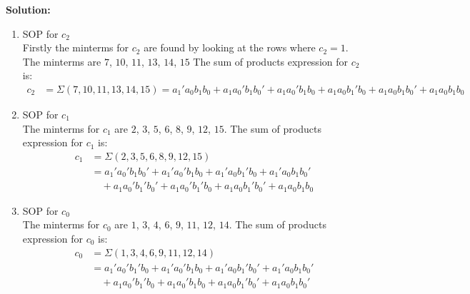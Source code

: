 \documentclass[table]{article}
\begin{document}
\begin{enumerate}[label=\textbf{\arabic*.}]
\begin{enumerate}[label=\textbf{\alph*.}]
        \textbf{Solution:} \\

        \begin{enumerate}[label=\textbf{\roman* .}]
            \item SOP for \(c_2\) \\
        
            Firstly the minterms for \(c_2\) are found by looking at the rows where \(c_2 = 1\). The minterms are \(7\), \(10\), \(11\), \(13\), \(14\), \(15\) The sum of products expression for \(c_2\) is: \\
            
            \begin{align*}
                c_2 &= \Sigma(7, 10, 11, 13, 14, 15) = a_1'a_0b_1b_0 + a_1a_0'b_1b_0' + a_1a_0'b_1b_0 + a_1a_0b_1'b_0 + a_1a_0b_1b_0' + a_1a_0b_1b_0
            \end{align*}

            \item SOP for \(c_1\) \\
            
            The minterms for \(c_1\) are \(2\), \(3\), \(5\), \(6\), \(8\), \(9\), \(12\), \(15\). The sum of products expression for \(c_1\) is: \\
            
            \begin{align*}
                c_1 &= \Sigma(2, 3, 5, 6, 8, 9, 12, 15) \\
                    &= a_1'a_0'b_1b_0' + a_1'a_0'b_1b_0 + a_1'a_0b_1'b_0 + a_1'a_0b_1b_0' \\
                    &\quad + a_1a_0'b_1'b_0' + a_1a_0'b_1'b_0 + a_1a_0b_1'b_0' + a_1a_0b_1b_0 
            \end{align*}
            

            \item SOP for \(c_0\) \\
            
            The minterms for \(c_0\) are \(1\), \(3\), \(4\), \(6\), \(9\), \(11\), \(12\), \(14\). The sum of products expression for \(c_0\) is: \\
            
            
            \begin{align*}
                c_0 &= \Sigma(1, 3, 4, 6, 9, 11, 12, 14) \\
                    &= a_1'a_0'b_1'b_0 + a_1'a_0'b_1b_0 + a_1'a_0b_1'b_0' + a_1'a_0b_1b_0' \\
                    &\quad + a_1a_0'b_1'b_0 + a_1a_0'b_1b_0 + a_1a_0b_1'b_0' + a_1a_0b_1b_0'
            \end{align*}


\end{enumerate}
\end{enumerate}
\end{enumerate}
\end{document}
